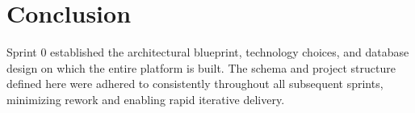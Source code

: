 \section*{Conclusion}
Sprint 0 established the architectural blueprint, technology choices, and database design on which the entire platform is built. The schema and project structure defined here were adhered to consistently throughout all subsequent sprints, minimizing rework and enabling rapid iterative delivery.
